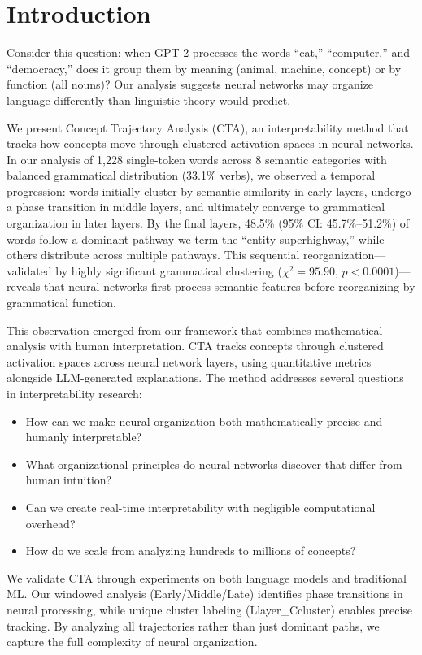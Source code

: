 \section{Introduction}

Consider this question: when GPT-2 processes the words ``cat,'' ``computer,'' and ``democracy,'' does it group them by meaning (animal, machine, concept) or by function (all nouns)? Our analysis suggests neural networks may organize language differently than linguistic theory would predict.

We present Concept Trajectory Analysis (CTA), an interpretability method that tracks how concepts move through clustered activation spaces in neural networks. In our analysis of 1,228 single-token words across 8 semantic categories with balanced grammatical distribution (33.1\% verbs), we observed a temporal progression: words initially cluster by semantic similarity in early layers, undergo a phase transition in middle layers, and ultimately converge to grammatical organization in later layers. By the final layers, 48.5\% (95\% CI: 45.7\%–51.2\%) of words follow a dominant pathway we term the ``entity superhighway,'' while others distribute across multiple pathways. This sequential reorganization—validated by highly significant grammatical clustering ($\chi^2 = 95.90$, $p < 0.0001$)—reveals that neural networks first process semantic features before reorganizing by grammatical function.

This observation emerged from our framework that combines mathematical analysis with human interpretation. CTA tracks concepts through clustered activation spaces across neural network layers, using quantitative metrics alongside LLM-generated explanations. The method addresses several questions in interpretability research:

\begin{itemize}
    \item How can we make neural organization both mathematically precise and humanly interpretable?
    \item What organizational principles do neural networks discover that differ from human intuition?
    \item Can we create real-time interpretability with negligible computational overhead?
    \item How do we scale from analyzing hundreds to millions of concepts?
\end{itemize}

We validate CTA through experiments on both language models and traditional ML. Our windowed analysis (Early/Middle/Late) identifies phase transitions in neural processing, while unique cluster labeling (L{layer}_C{cluster}) enables precise tracking. By analyzing all trajectories rather than just dominant paths, we capture the full complexity of neural organization.

